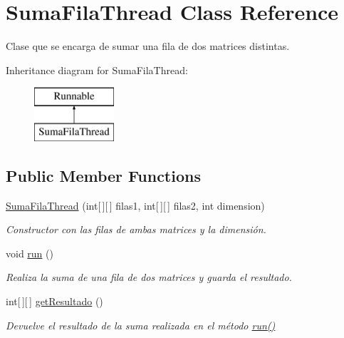 \hypertarget{classSumaFilaThread}{\section{Suma\-Fila\-Thread Class Reference}
\label{classSumaFilaThread}
}


Clase que se encarga de sumar una fila de dos matrices distintas.  


Inheritance diagram for Suma\-Fila\-Thread\-:\begin{figure}[H]
\begin{center}
\leavevmode
\includegraphics[height=2.000000cm]{classSumaFilaThread}
\end{center}
\end{figure}
\subsection*{Public Member Functions}
\begin{DoxyCompactItemize}
\item 
\hyperlink{classSumaFilaThread_aad7a9f1cd3147750ba93322f6642743d}{Suma\-Fila\-Thread} (int\mbox{[}$\,$\mbox{]}\mbox{[}$\,$\mbox{]} filas1, int\mbox{[}$\,$\mbox{]}\mbox{[}$\,$\mbox{]} filas2, int dimension)
\begin{DoxyCompactList}\small\item\em Constructor con las filas de ambas matrices y la dimensión. \end{DoxyCompactList}\item 
void \hyperlink{classSumaFilaThread_ad8fa946cd44e708f69cd98b3ec4c824e}{run} ()
\begin{DoxyCompactList}\small\item\em Realiza la suma de una fila de dos matrices y guarda el resultado. \end{DoxyCompactList}\item 
int\mbox{[}$\,$\mbox{]}\mbox{[}$\,$\mbox{]} \hyperlink{classSumaFilaThread_aff2e595cc56767d6beecbecc84781651}{get\-Resultado} ()
\begin{DoxyCompactList}\small\item\em Devuelve el resultado de la suma realizada en el método \hyperlink{classSumaFilaThread_ad8fa946cd44e708f69cd98b3ec4c824e}{run()} \end{DoxyCompactList}\end{DoxyCompactItemize}


